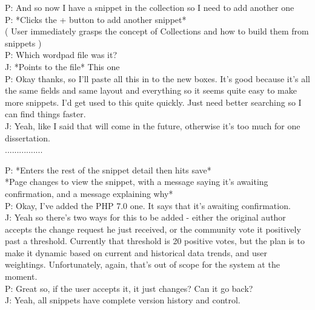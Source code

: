 P: And so now I have a snippet in the collection so I need to add another one  \\
P: *Clicks the + button to add another snippet* \\
( User immediately grasps the concept of Collections and how to build them from snippets ) \\
P: Which wordpad file was it? \\
J: \-\hspace{1.4cm}*Points to the file* This one \\
P: Okay thanks, so I'll paste all this in to the new boxes. It's good because it's all the same fields and same layout and everything so it seems quite easy to make more snippets. I'd get used to this quite quickly. Just need better searching so I can find things faster. \\
J: \-\hspace{1.4cm}Yeah, like I said that will come in the future, otherwise it's too much for one dissertation. \\

................ 

P: *Enters the rest of the snippet detail then hits save* \\
*Page changes to view the snippet, with a message saying it's awaiting confirmation, and a message explaining why* \\
P: Okay, I've added the PHP 7.0 one. It says that it's awaiting confirmation. \\
J: \-\hspace{1.4cm}Yeah so there's two ways for this to be  added - either the original author accepts the change request he just received, or the community vote it positively past a threshold. Currently that threshold is 20 positive votes, but the plan is to make it dynamic based on current and historical data trends, and user weightings. Unfortunately, again, that's out of scope for the system at the moment. \\
P: Great so, if the user accepts it, it just changes? Can it go back? \\
J: \-\hspace{1.4cm}Yeah, all snippets have complete version history and control. 

